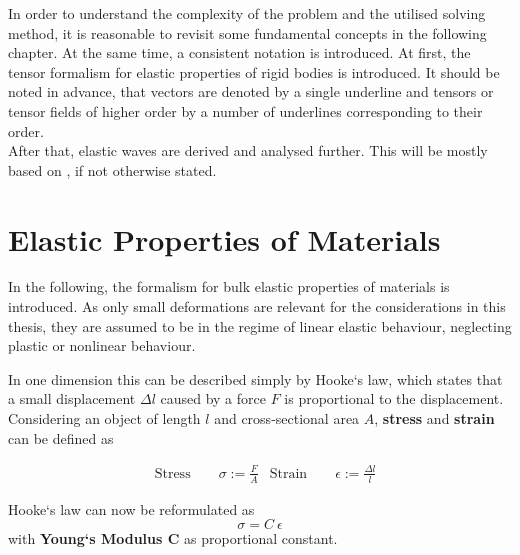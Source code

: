 In order to understand the complexity of the problem  and the
utilised solving method, it is reasonable to revisit some fundamental concepts
in the following chapter. At the same time, a consistent notation is
introduced. At first, the tensor formalism for elastic properties
of rigid bodies is introduced. It should be noted in advance, that vectors are
denoted by a single underline and tensors or
tensor fields of higher order by a number of underlines corresponding to their
order. \\ After that, elastic waves are derived and analysed
further. This will be mostly based on \cite{GrossMarx2014}, if not otherwise
stated.

\section{Elastic Properties of Materials}
In the following, the formalism for bulk elastic properties of materials is
introduced. As only small deformations are relevant for the considerations in
this thesis, they are assumed to be in the regime of linear elastic behaviour,
neglecting plastic or nonlinear behaviour.

In one dimension this can be described simply by Hooke`s law, which states
that a small displacement $\Delta l$ caused by a force $F$ is
proportional to the displacement. Considering an object of length $l$ and
cross-sectional area $A$, \textbf{stress} and \textbf{strain} can be defined as

\begin{align}
     & \text{Stress} \quad \quad \sigma := \frac{F}{A}
     & \text{Strain} \quad \quad \epsilon := \frac{\Delta l}{l}
\end{align}

Hooke`s law can now be reformulated as
\begin{equation}
    \label{eq:HookStress1D}
    \sigma = C\ \epsilon
\end{equation}
with \textbf{Young`s Modulus C} as proportional constant.

